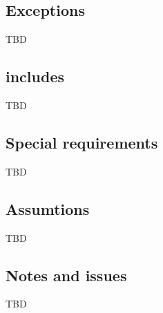 \documentclass[a4paper]{article}
\begin{document}
\subsection{Exceptions}
TBD
\subsection{includes}
TBD
\subsection{Special requirements}
TBD
\subsection{Assumtions}
TBD
\subsection{Notes and issues}
TBD
\end{document}
